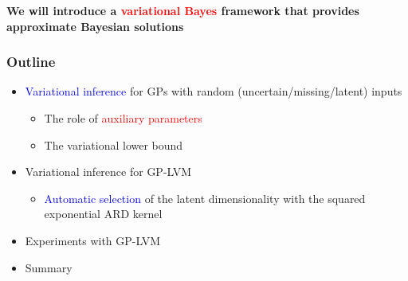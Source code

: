 \documentclass{beamer}
\begin{document}
{{\bf We will introduce a \textcolor{red}{variational Bayes} framework
 that provides approximate Bayesian solutions} 

%      
%
% 
% 


}




\frame
{
\frametitle{Outline}

\begin{itemize}

\item \textcolor{blue}{Variational inference} for GPs with random (uncertain/missing/latent) inputs 

\begin{itemize}

     \item The role of \textcolor{red}{auxiliary parameters} 

     \item The variational lower bound 
  


\end{itemize} 

\item Variational inference for GP-LVM  

\begin{itemize}

  \item \textcolor{blue}{Automatic selection} of the latent
        dimensionality with the squared exponential ARD kernel 

\end{itemize} 

\item Experiments with GP-LVM

\item Summary 
 
\end{itemize} 

}
\end{document}
